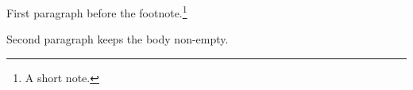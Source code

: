 \hsize=4in
\vsize=8.9in
\nopagenumbers
\noindent First paragraph before the footnote.\footnote*{A short note.}
\par
\noindent Second paragraph keeps the body non-empty.
\par
\bye
